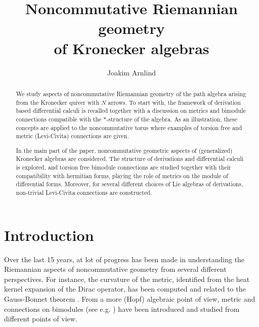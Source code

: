 \documentclass{amsart}
\title[Noncommutative Riemannian geometry of Kronecker algebras]{Noncommutative Riemannian geometry\\ of Kronecker algebras}
\author{Joakim Arnlind}
\theoremstyle{definition}
\theoremstyle{remark}
\numberwithin{equation}{section}
\begin{document}
\begin{abstract}
  We study aspects of noncommutative Riemannian geometry of the path
  algebra arising from the Kronecker quiver with $N$ arrows. To start
  with, the framework of derivation based differential calculi is
  recalled together with a discussion on metrics and bimodule
  connections compatible with the $\ast$-structure of the algebra. As
  an illustration, these concepts are applied to the noncommutative
  torus where examples of torsion free and metric (Levi-Civita)
  connections are given.

  In the main part of the paper, noncommutative geometric aspects of (generalized)
  Kronecker algebras are considered. The structure of derivations and
  differential calculi is explored, and torsion free bimodule
  connections are studied together with their compatibility with
  hermitian forms, playing the role of metrics on the module of
  differential forms. Moreover, for several different choices of Lie algebras of
  derivations, non-trivial Levi-Civita connections are constructed.
\end{abstract}

\maketitle

\tableofcontents


\section{Introduction}

\noindent
Over the last 15 years, at lot of progress has been made in
understanding the Riemannian aspects of noncommutative geometry from
several different perspectives. For instance, the curvature of the
metric, identified from the heat kernel expansion of the Dirac
operator, has been computed
\cite{fk:scalarCurvature,cm:modularCurvature} and related to the
Gauss-Bonnet theorem \cite{ct:gaussBonnet,fk:gaussBonnet}. From a more
(Hopf) algebraic point of view, metric and connections on bimodules
(see e.g. \cite{ac:ncgravitysolutions}
\cite{as:noncommutative.connections.twists}
\cite{bm:Quantum.Riemannian.geometry} \cite{ail:lc.quantum.spheres})
have been introduced and studied from different points of view.
\end{document}
